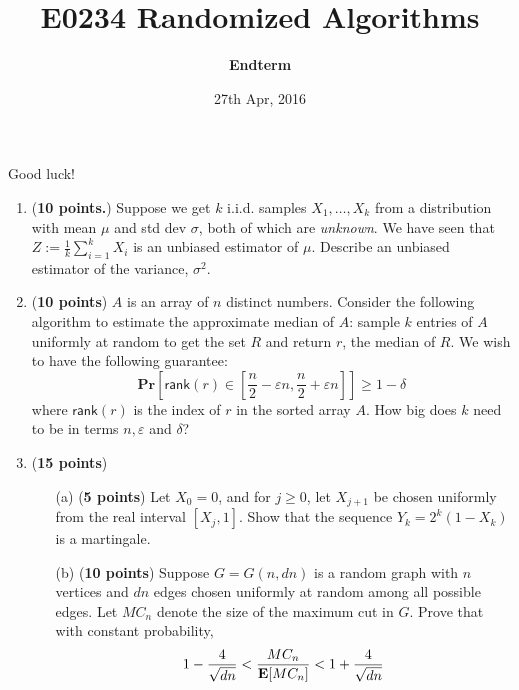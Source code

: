 \documentclass[11pt]{article}
\def\eps{\varepsilon}
\def\Pr{\mathbf{Pr}}
\def\Pr{\mathbf{Pr}}
\begin{document}
\title{E0234 Randomized Algorithms}
\author{\bf Endterm}
\date{27th Apr, 2016}
\maketitle
\thispagestyle{empty}
\def\poly{{\tt poly}}
\begin{center}
{\small 
Good luck!
}


\end{center}

\begin{enumerate}
\item ({\bf 10 points.})
Suppose we get $k$ i.i.d. samples  $X_1,\ldots,X_k$ from a distribution with mean $\mu$ and std dev $\sigma$, both of which are {\em unknown}.
We have seen that $Z := \frac{1}{k}\sum_{i=1}^k X_i$ is an unbiased estimator of $\mu$. Describe an unbiased estimator of the variance, $\sigma^2$.

\vspace{.5in}

\item ({\bf 10 points}) $A$ is an array of $n$ distinct numbers. Consider the following algorithm to estimate the approximate median of $A$: sample $k$ entries of $A$ uniformly at random to get the set $R$ and return $r$, the median of $R$. We wish to have the following guarantee:
\[
\Pr\left[\mathsf{rank}(r) \in \left[\frac{n}{2} - \eps n , \frac{n}{2} + \eps n \right] \right] \geq 1-\delta
\]
where $\mathsf{rank}(r)$ is the index of $r$ in the sorted array $A$. How big does $k$ need to be in terms $n,\eps$ and $\delta$?

\vspace{.5in}

\item ({\bf 15 points})
\begin{itemize}
\item[(a)] ({\bf 5 points})
Let $X_0 = 0$, and for $j \geq 0$, let $X_{j+1}$ be chosen uniformly from the real interval $[X_j, 1]$. Show that the sequence $Y_k = 2^k (1-X_k)$ is a martingale.

\item[(b)] ({\bf 10 points})
Suppose $G = G(n,dn)$ is a random graph with $n$ vertices and $dn$ edges chosen uniformly at random among all possible edges. Let $MC_n$ denote the size of the maximum cut in $G$. Prove that with constant probability, $$1-\frac{4}{\sqrt{dn}}< \frac{MC_n}{\hbox{\bf E}[MC_n]} < 1+\frac{4}{\sqrt{dn}}$$
\end{itemize}


\end{enumerate}
\end{document}
